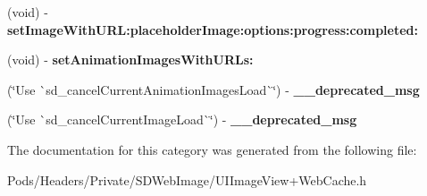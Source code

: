 \begin{DoxyCompactItemize}
(void) -\/ {\bfseries set\+Image\+With\+U\+R\+L\+:placeholder\+Image\+:options\+:progress\+:completed\+:}
\item 
\mbox{\label{category_u_i_image_view_07_web_cache_deprecated_08_ad1d56b45c88fda02294d2df8c820c175}} 
(void) -\/ {\bfseries set\+Animation\+Images\+With\+U\+R\+Ls\+:}
\item 
\mbox{\label{category_u_i_image_view_07_web_cache_deprecated_08_ac76fd2691079d4ecf8e24913a99ceb60}} 
(\char`\"{}Use \`{}sd\+\_\+cancel\+Current\+Animation\+Images\+Load\`{}\char`\"{}) -\/ {\bfseries \+\_\+\+\_\+deprecated\+\_\+msg}
\item 
\mbox{\label{category_u_i_image_view_07_web_cache_deprecated_08_a0184d8f358c9009de3cf96d844df495b}} 
(\char`\"{}Use \`{}sd\+\_\+cancel\+Current\+Image\+Load\`{}\char`\"{}) -\/ {\bfseries \+\_\+\+\_\+deprecated\+\_\+msg}
\end{DoxyCompactItemize}


The documentation for this category was generated from the following file\+:\begin{DoxyCompactItemize}
\item 
Pods/\+Headers/\+Private/\+S\+D\+Web\+Image/U\+I\+Image\+View+\+Web\+Cache.\+h\end{DoxyCompactItemize}
